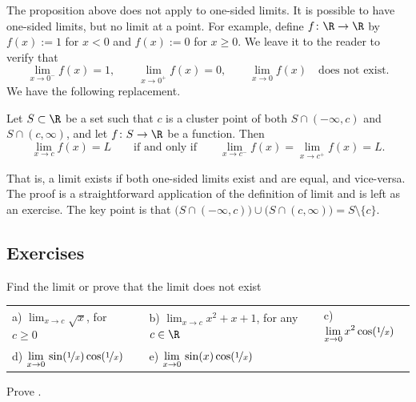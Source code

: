 \documentclass[12pt]{book}
\begin{document}
The proposition above does not apply to one-sided limits.
It is possible to have one-sided limits, but no limit at a point.
For
example, define $f \colon \R \to \R$ by $f(x) := 1$ for $x < 0$ and
$f(x) :=
0$ for $x \geq 0$.
We leave it to the reader to verify that
\begin{equation*}
\lim_{x \to 0^-} f(x) = 1, \qquad
\lim_{x \to 0^+} f(x) = 0, \qquad
\lim_{x \to 0} f(x) \quad \text{does not exist.}
\end{equation*}
We have the following replacement.


\begin{prop} \label{prop:onesidedlimits}
Let $S \subset \R$ be a set such that $c$ is a cluster point
of both $S \cap (-\infty,c)$ and $S \cap (c,\infty)$, and let
$f \colon S \to \R$ be a function.
Then
\begin{equation*}
\lim_{x \to c} f(x) = L
\qquad \text{if and only if} \qquad
\lim_{x \to c^-} f(x) =
\lim_{x \to c^+} f(x) =
L .
\end{equation*}
\end{prop}

That is, a limit exists if both one-sided limits exist and are equal, and
vice-versa.
The
proof is a straightforward application of the definition of limit
and is left as an exercise.
The key point is that
$\bigl( S \cap (-\infty,c) \bigr) \cup \bigl( S \cap (c,\infty) \bigr)
= S \setminus \{ c \}$.

\subsection*{Exercises}

\begin{exercise}
Find the limit or prove that the limit does not exist

\medskip

\noindent
\begin{tabular}{lllll}
a)
$\displaystyle
\lim_{x\to c} \sqrt{x}
$, for $c \geq 0$
& &
b)
$\displaystyle
\lim_{x\to c} x^2+x+1
$, for any $c \in \R$
& &
c)
$\displaystyle
\lim_{x\to 0} x^2 \cos (\nicefrac{1}{x})
$
\\
d)
$\displaystyle
\lim_{x\to 0}\, \sin(\nicefrac{1}{x}) \cos (\nicefrac{1}{x})
$
& &
e)
$\displaystyle
\lim_{x\to 0}\, \sin(x) \cos (\nicefrac{1}{x})
$ & 
\end{tabular}
\end{exercise}

\begin{exercise}
Prove .
\end{exercise}
\end{document}
